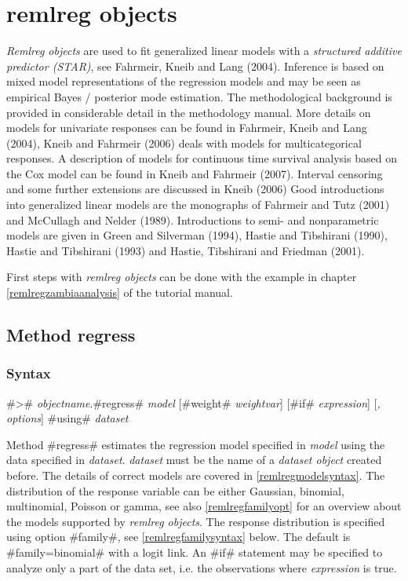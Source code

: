 \chapter{remlreg objects}\normalsize
\label{remlreg} 

{\em Remlreg objects} are used to fit generalized linear models with
a {\em structured additive predictor (STAR)}, see Fahrmeir, Kneib
and Lang (2004). Inference is based on mixed model representations
of the regression models and may be seen as empirical Bayes /
posterior mode estimation. The methodological background is provided
in considerable detail in the methodology manual. More details on
models for univariate responses can be found in Fahrmeir, Kneib and
Lang (2004), Kneib and Fahrmeir (2006) deals with models for
multicategorical responses. A description of models for continuous
time survival analysis based on the Cox model can be found in Kneib
and Fahrmeir (2007). Interval censoring and some further extensions
are discussed in Kneib (2006) Good introductions into generalized
linear models are the monographs of Fahrmeir and Tutz (2001) and
McCullagh and Nelder (1989). Introductions to semi- and
nonparametric models are given in Green and Silverman (1994), Hastie
and Tibshirani (1990), Hastie and Tibshirani (1993) and Hastie,
Tibshirani and Friedman (2001).

First steps with {\em remlreg objects} can be done with the example
in chapter \ref*{remlregzambiaanalysis} of the tutorial manual.

\section{Method regress}
\label{remlregregress}

\subsection{Syntax}
\label{remlregregresssyntax}

 #># {\em objectname}.#regress# {\em model} [#weight# {\em weightvar}] [#if# {\em expression}] [{\em , options}] #using# {\em dataset}

Method #regress# estimates the regression model specified in {\em
model} using the data specified in {\em dataset}. {\em dataset}
must be the name of a {\em dataset object} created before. The
details of correct models are covered in
\autoref{remlregmodelsyntax}. The distribution of the response
variable can be either Gaussian, binomial, multinomial, Poisson or
gamma, see also \autoref{remlregfamilyopt} for an overview about
the models supported by {\em remlreg objects}. The response
distribution is specified using option #family#, see
\autoref{remlregfamilysyntax} below. The default is
#family=binomial# with a logit link. An #if# statement may be
specified to analyze only a part of the data set, i.e. the
observations where {\em expression} is true.

